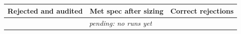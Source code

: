 \begin{tabular}{rrr}
\toprule
Rejected and audited & Met spec after sizing & Correct rejections \\
\midrule
\multicolumn{3}{c}{\textit{pending: no runs yet}} \\
\bottomrule
\end{tabular}
